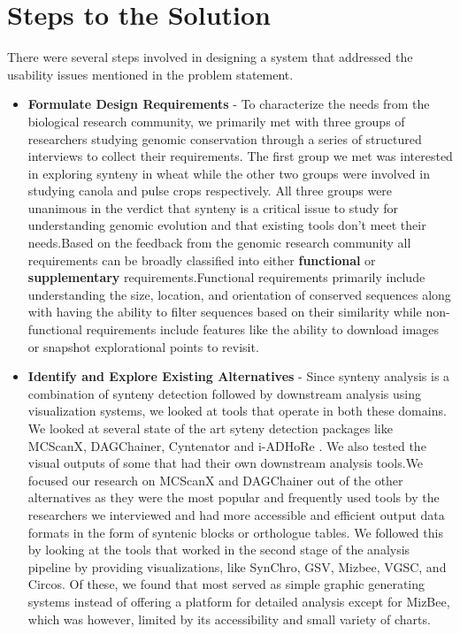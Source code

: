 \section{Steps to the Solution} 
There were several steps involved in designing a system that addressed the usability issues mentioned in the problem statement.

\begin{itemize}
    
    \item \textbf{Formulate Design Requirements} -
    To characterize the needs from the biological research community, we primarily met with three groups of researchers studying genomic conservation through a series of structured interviews to collect their requirements. The first group we met was interested in exploring synteny in wheat while the other two groups were involved in studying canola and pulse crops respectively. All three groups were unanimous in the verdict that synteny is a critical issue to study for understanding genomic evolution and that existing tools don't meet their needs.Based on the feedback from the genomic research community all requirements can be broadly classified into either \textbf{functional} or \textbf{supplementary} requirements.Functional requirements primarily include understanding the size, location, and orientation of conserved sequences along with having the ability to filter sequences based on their similarity while non-functional requirements include features like the ability to download images or snapshot explorational points to revisit.
    
    \item \textbf{Identify and Explore Existing Alternatives} - 
    Since synteny analysis is a combination of synteny detection followed by downstream analysis using visualization systems, we looked at tools that operate in both these domains. We looked at several state of the art syteny detection packages like MCScanX, DAGChainer, Cyntenator and i-ADHoRe \cite{wang2012mcscanx,haas2004dagchainer,rodelsperger2010cyntenator,proost2011adhore}. We also tested the visual outputs of some that had their own downstream analysis tools.We focused our research on MCScanX and DAGChainer out of the other alternatives as they were the most popular and frequently used tools by the researchers we interviewed and had more accessible and  efficient output data formats in the form of syntenic blocks or orthologue tables. We followed this by looking at the tools that worked in the second stage of the analysis pipeline by providing visualizations, like SynChro, GSV, Mizbee, VGSC, and Circos\cite{drillon2014synchro,revanna2011gsv,Meyer2009,xu2016vgsc}. Of these, we found that most served as simple graphic generating systems instead of offering a platform for detailed analysis except for MizBee, which was however, limited by its accessibility and small variety of charts.


\end{itemize}
